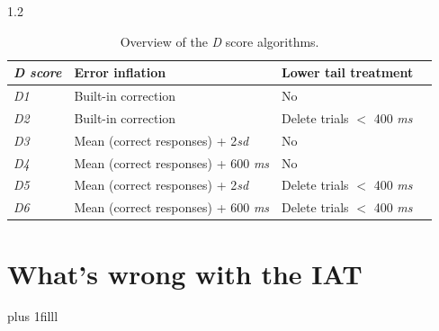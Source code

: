 \documentclass{beamer}
\newcommand\Factor{1.2}
\begin{document}
\begin{frame}
	
	\begin{spacing}\Factor
		\begin{table}[th!]
			\centering
			\caption{\label{tab:overview} Overview of the \emph{D} score algorithms.}
			\begin{tabularx}{\linewidth}{llll}
				\hline
				\emph{D score} & Error inflation & Lower tail treatment\\\hline
				\emph{D1} & Built-in correction & No \\
				\emph{D2} & Built-in correction & Delete trials $<$ 400 \emph{ms} \\
				\emph{D3} & Mean (correct responses) + 2\emph{sd} & No\\
				\emph{D4} & Mean (correct responses) + 600 \emph{ms} & No \\
				\emph{D5} & Mean (correct responses) + 2\emph{sd} & Delete trials $<$ 400 \emph{ms}\\
				\emph{D6} & Mean (correct responses) + 600 \emph{ms} & Delete trials $<$ 400 \emph{ms} \\\hline
			\end{tabularx}
		\end{table}
	\end{spacing}
\end{frame}

\section[What's wrong]{What's wrong with the IAT}
\vskip0pt plus 1filll
\end{document}
